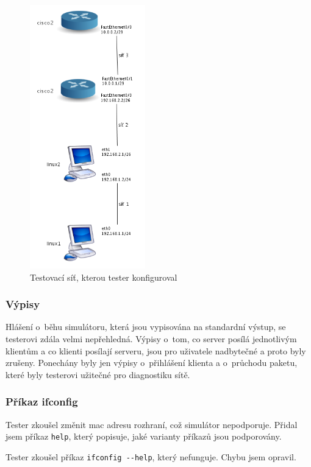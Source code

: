 \begin{figure}[h]
\begin{center}
\includegraphics[width=5cm]{obrazky/testovani}
\caption{Testovací síť, kterou tester konfiguroval}
\label{obr_testovani}
\end{center}
\end{figure}

\subsubsection{Výpisy}

Hlášení o~běhu simulátoru, která jsou vypisována na standardní výstup, se testerovi zdála velmi nepřehledná. Výpisy o~tom, co server posílá jednotlivým klientům a co klienti posílají serveru, jsou pro uživatele nadbytečné a proto byly zrušeny. Ponechány byly jen výpisy o~přihlášení klienta a o~průchodu paketu, které byly testerovi užitečné pro diagnostiku sítě.

\subsubsection{Příkaz ifconfig}

Tester zkoušel změnit mac adresu rozhraní, což simulátor nepodporuje. Přidal jsem příkaz \verb|help|, který popisuje, jaké varianty příkazů jsou podporovány.

Tester zkoušel příkaz \verb|ifconfig --help|, který nefunguje. Chybu jsem opravil.

